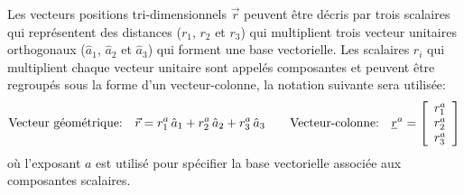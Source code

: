Les vecteurs positions tri-dimensionnels $\vec{r}$ peuvent être décris par trois scalaires qui représentent des distances ($r_1$, $r_2$ et $r_3$) qui multiplient trois vecteur unitaires orthogonaux ($\hat{a}_1$, $\hat{a}_2$ et $\hat{a}_3$) qui forment une base vectorielle.  Les scalaires $r_i$ qui multiplient chaque vecteur unitaire sont appelés composantes et peuvent être regroupés sous la forme d'un vecteur-colonne, la notation suivante sera utilisée:
\begin{equation}
\text{Vecteur géométrique:}\quad
\vec{r} = r_1^a \, \hat{a}_{1} + r_2^a \, \hat{a}_{2} + r_3^a \, \hat{a}_{3}
\quad \quad 
\text{Vecteur-colonne:}\quad
\underline{r}^{a} = \left[ \begin{array}{c} r_1^a \\ r_2^a \\ r_3^a  \end{array} \right] 
\label{eq:veccoldef}
\end{equation} 
où l'exposant $a$ est utilisé pour spécifier la base vectorielle associée aux composantes scalaires. 



